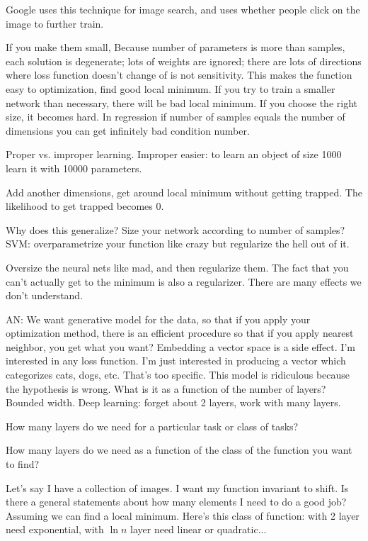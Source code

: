 Google uses this technique for image search, and uses whether people click on the image to further train.

If you make them small, Because number of parameters is more than samples, each solution is degenerate; lots of weights are ignored; there are lots of directions where loss function doesn't change of is not sensitivity. This makes the function easy to optimization, find good local minimum. If you try to train a smaller network than necessary, there will be bad local minimum. If you choose the right size, it becomes hard. In regression if number of samples equals the number of dimensions you can get infinitely bad condition number.

Proper vs. improper learning. Improper easier: to learn an object of size 1000 learn it with 10000 parameters.

Add another dimensions, get around local minimum without getting trapped. The likelihood to get trapped becomes 0.

Why does this generalize? Size your network according to number of samples?
SVM: overparametrize your function like crazy but regularize the hell out of it. 

Oversize the neural nets like mad, and then regularize them. The fact that you can't actually get to the minimum is also a regularizer. There are many effects we don't understand.

AN: We want generative model for the data, so that if you apply your optimization method, there is an efficient procedure so that if you apply nearest neighbor, you get what you want?
Embedding a vector space is a side effect. I'm interested in any loss function. I'm just interested in producing a vector which  categorizes cats, dogs, etc.
That's too specific. This model is ridiculous because the hypothesis is wrong. What is it as a function of the number of layers? Bounded width. Deep learning: forget about 2 layers, work with many layers.

How many layers do we need for a particular task or class of tasks?

How many layers do we need as a function of the class of the function you want to find?

Let's say I have a collection of images.  I want my function invariant to shift. Is there a general statements about how many elements I need to do a good job? Assuming we can find a local minimum. Here's this class of function: with 2 layer need exponential, with $\ln n$ layer need linear or quadratic...

